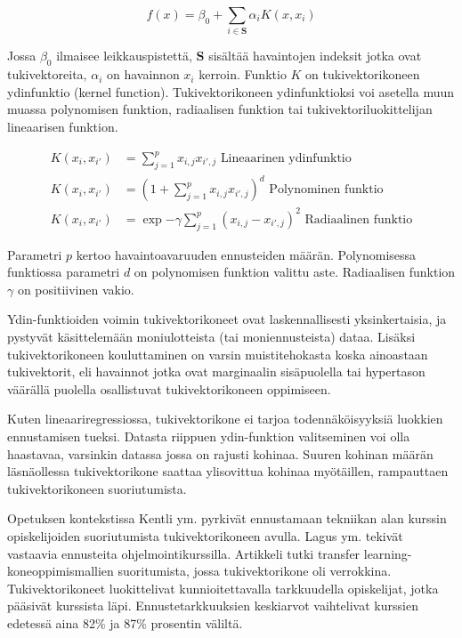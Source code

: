 \documentclass[finnish,twoside,openright]{HYgraduMLDS}
\begin{document}
\begin{equation}
    f(x) = \beta_0 + \sum_{i \in \textbf{S}} \alpha_i K(x, x_i)
\end{equation}

Jossa $\beta_0$ ilmaisee leikkauspistettä, $\textbf{S}$ sisältää havaintojen indeksit jotka ovat tukivektoreita, $\alpha_i$ on havainnon $x_i$ kerroin. Funktio $K$ on tukivektorikoneen ydinfunktio (kernel function). Tukivektorikoneen ydinfunktioksi voi asetella muun muassa polynomisen funktion, radiaalisen funktion tai tukivektoriluokittelijan lineaarisen funktion.

\begin{align}
    K(x_i, x_{i'}) &= \sum^p_{j=1} x_{i, j} x_{i', j} \text{ Lineaarinen ydinfunktio}\\
    K(x_i, x_{i'}) &= (1 + \sum^p_{j=1} x_{i, j} x_{i', j} )^d \text{ Polynominen funktio}\\
    K(x_i, x_{i'}) &= \exp{-\gamma \sum^p_{j=1}( x_{i, j} - x_{i', j} )^2} \text{ Radiaalinen funktio}
\end{align}

Parametri $p$ kertoo havaintoavaruuden ennusteiden määrän. Polynomisessa funktiossa parametri $d$ on polynomisen funktion valittu aste. Radiaalisen funktion $\gamma$ on positiivinen vakio.

Ydin-funktioiden voimin tukivektorikoneet ovat laskennallisesti yksinkertaisia, ja pystyvät käsittelemään moniulotteista (tai moniennusteista) dataa. Lisäksi tukivektorikoneen kouluttaminen on varsin muistitehokasta koska ainoastaan tukivektorit, eli havainnot jotka ovat marginaalin sisäpuolella tai hypertason väärällä puolella osallistuvat tukivektorikoneen oppimiseen. 

Kuten lineaariregressiossa, tukivektorikone ei tarjoa todennäköisyyksiä luokkien ennustamisen tueksi. Datasta riippuen ydin-funktion valitseminen voi olla haastavaa, varsinkin datassa jossa on rajusti kohinaa. Suuren kohinan määrän läsnäollessa tukivektorikone saattaa ylisovittua kohinaa myötäillen, rampauttaen tukivektorikoneen suoriutumista.

Opetuksen kontekstissa Kentli ym. \cite{kentli2011svm} pyrkivät ennustamaan tekniikan alan kurssin opiskelijoiden suoriutumista tukivektorikoneen avulla. Lagus ym. \cite{lagus2018transfer} tekivät vastaavia ennusteita ohjelmointikurssilla. Artikkeli\cite{lagus2018transfer} tutki transfer learning-koneoppimismallien suoritumista, jossa tukivektorikone oli verrokkina. Tukivektorikoneet luokittelivat kunnioitettavalla tarkkuudella opiskelijat, jotka pääsivät kurssista läpi. Ennustetarkkuuksien keskiarvot vaihtelivat kurssien edetessä aina 82\% ja 87\% prosentin väliltä.
\end{document}
